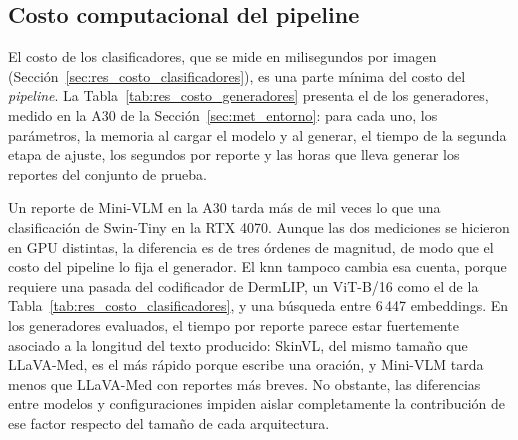 \subsection{Costo computacional del pipeline}
\label{sec:res_costo}

El costo de los clasificadores, que se mide en milisegundos por imagen (Sección~\ref{sec:res_costo_clasificadores}),
es una parte mínima del costo del \emph{pipeline}. La Tabla~\ref{tab:res_costo_generadores} presenta el de los generadores, medido en la A30 de la
Sección~\ref{sec:met_entorno}: para cada uno, los parámetros, la memoria al cargar el modelo y al generar, el tiempo de la
segunda etapa de ajuste, los segundos por reporte y las horas que lleva generar los reportes del conjunto de prueba.

Un reporte de Mini-VLM en la A30 tarda más de mil veces lo que una clasificación de Swin-Tiny en la RTX 4070. Aunque
las dos mediciones se hicieron en GPU distintas, la diferencia es de tres órdenes de magnitud, de modo que el costo del
pipeline lo fija el generador. El \gls{knn} tampoco cambia esa cuenta, porque requiere una pasada del
codificador de DermLIP, un ViT-B/16 como el de la Tabla~\ref{tab:res_costo_clasificadores}, y una búsqueda entre 6\,447 embeddings. En los generadores evaluados, el tiempo por reporte parece estar fuertemente asociado a la longitud del texto producido: SkinVL, del mismo tamaño que LLaVA-Med, es el más rápido porque escribe una oración, y Mini-VLM tarda menos que LLaVA-Med con reportes más breves. No obstante, las diferencias entre modelos y configuraciones impiden aislar completamente la contribución de ese factor respecto del tamaño de cada arquitectura.

